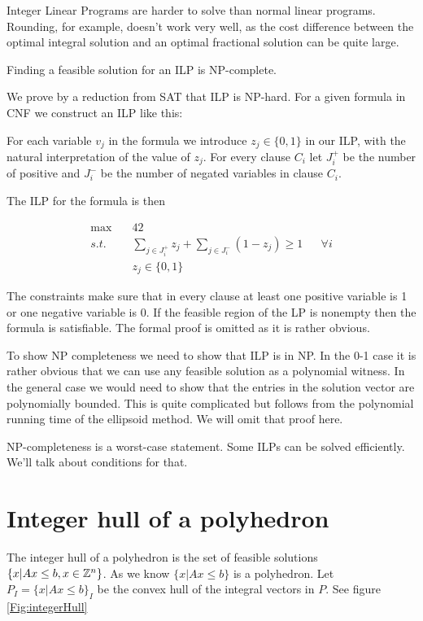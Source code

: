 Integer Linear Programs are harder to solve than normal linear programs. Rounding, for example, doesn't work very well, as the cost difference between the optimal integral solution and an optimal fractional solution can be quite large.

\begin{thm} Finding a feasible solution for an ILP is NP-complete.
\end{thm}

\begin{pr} We prove by a reduction from SAT that ILP is NP-hard. For a given formula in CNF we construct an ILP like this:

For each variable $v_j$ in the formula we introduce $z_j \in \{0,1\}$ in our ILP, with the natural interpretation of the value of $z_j$. For every clause $C_i$ let $J^+_i$ be the number of positive and $J^-_i$ be the number of negated variables in clause $C_i$.

The ILP for the formula is then

\begin{align*}
\max \quad & 42 \\
s.t. &\sum_{j\in J^+_i} z_j + \sum_{j\in J^-_i} (1-z_j) \geq 1 && \forall i\\
&z_j \in \{0,1\}
\end{align*}

The constraints make sure that in every clause at least one positive variable is 1 or one negative variable is 0. If the feasible region of the LP is nonempty then the formula is satisfiable. The formal proof is omitted as it is rather obvious.

To show NP completeness we need to show that ILP is in NP. In the 0-1 case it is rather obvious that we can use any feasible solution as a polynomial witness. In the general case we would need to show that the entries in the solution vector are polynomially bounded. This is quite complicated but follows from the polynomial running time of the ellipsoid method. We will omit that proof here.
\end{pr}

NP-completeness is a worst-case statement. Some ILPs can be solved efficiently. We'll talk about conditions for that.

\section{Integer hull of a polyhedron}

The integer hull of a polyhedron is the set of feasible solutions $\{x | Ax\leq b, x\in \mathbb{Z}^n\}$. As we know $\{x|Ax\leq b\}$ is a polyhedron. Let $P_I = \{x| Ax\leq b\}_I$ be the convex hull of the integral vectors in $P$. See figure \ref{Fig:integerHull}

